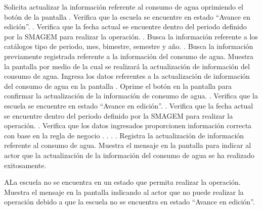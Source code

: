 \begin{UCtrayectoria}
    \UCpaso[\UCactor] Solicita actualizar la información referente al consumo de agua oprimiendo el botón  de la pantalla .
    \UCpaso[\UCsist] Verifica que la escuela se encuentre en estado ``Avance en edición''. .
    \UCpaso[\UCsist] Verifica que la fecha actual se encuentre dentro del periodo definido por la SMAGEM para realizar la operación. .
    \UCpaso[\UCsist] Busca la información referente a los catálogos tipo de periodo, mes, bimestre, semestre y año. .
    \UCpaso[\UCsist] Busca la información previamente registrada referente a la información del consumo de agua.
    \UCpaso[\UCsist] Muestra la pantalla  por medio de la cual se realizará la actualización de información del consumo de agua.
    \UCpaso[\UCactor] Ingresa los datos referentes a la actualización de información del consumo de agua en la pantalla . \label{cus21:IngresarDatos}
    \UCpaso[\UCactor] Oprime el botón  en la pantalla  para confirmar la actualización de la información de consumo de agua. . 
    \UCpaso[\UCsist] Verifica que la escuela se encuentre en estado ``Avance en edición''. .
    \UCpaso[\UCsist] Verifica que la fecha actual se encuentre dentro del periodo definido por la SMAGEM para realizar la operación. .
    \UCpaso[\UCsist] Verifica que los datos ingresados proporcionen información correcta con base en la regla de negocio . . . .    
    \UCpaso[\UCsist] Registra la actualización de información referente al consumo de agua.
    \UCpaso[\UCsist] Muestra el mensaje  en la pantalla  para indicar al actor que la actualización de la información del consumo de agua se ha realizado exitosamente.    
 \end{UCtrayectoria}
 
     \begin{UCtrayectoriaA}{A}{La escuela no se encuentra en un estado que permita realizar la operación.}
	\UCpaso[\UCsist] Muestra el mensaje  en la pantalla  indicando al actor que no puede realizar la operación debido a que la escuela no se encuentra en estado ``Avance en edición''. 
    \end{UCtrayectoriaA}
 
